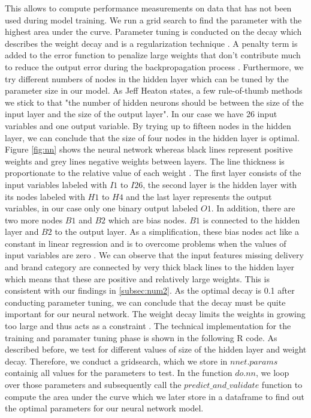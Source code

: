 \documentclass[12pt]{article}
\begin{document}
This allows to compute performance measurements on data that has not been used during model training. We run a grid search to find the parameter with the highest area under the curve.
Parameter tuning is conducted on the decay which describes the weight decay and is a regularization technique \cite{nielsen2015neural}. A penalty term is added to the error function to penalize large weights that don’t contribute much to reduce the output error during the backpropagation process \cite{witten2016data}. Furthermore, we try different numbers of nodes in the hidden layer which can be tuned by the parameter size in our model. As Jeff Heaton states, a few rule-of-thumb methods we stick to that "the number of hidden neurons should be between the size of the input layer and the size of the output layer". In our case we have 26 input variables and one output variable. By trying up to fifteen nodes in the hidden layer, we can conclude that the size of four nodes in the hidden layer is optimal. Figure \ref{fig:nn} shows the neural network whereas black lines represent positive weights and grey lines negative weights between layers. The line thickness is proportionate to the relative value of each weight \cite{beck2016neural}. The first layer consists of the input variables labeled with $I1$ to $I26$, the second layer is the hidden layer with its nodes labeled with $H1$ to $H4$ and the last layer represents the output variables, in our case only one binary output labeled $O1$. In addition, there are two more nodes $B1$ and $B2$ which are bias nodes. $B1$ is connected to the hidden layer and $B2$ to the output layer. As a simplification, these bias nodes act like a constant in linear regression and is to overcome problems when the values of input variables are zero \cite{tu1996advantages}. We can observe that the input features missing delivery and brand category are connected by very thick black lines to the hidden layer which means that these are positive and relatively large weights. This is consistent with our findings in \ref{subsec:num2}. As the optimal decay is 0.1 after conducting parameter tuning, we can conclude that the decay must be quite important for our neural network. The weight decay limits the weights in growing too large and thus acts as a constraint \cite{krogh1992simple}. 
The technical implementation for the training and paramater tuning phase is shown in the following R code. As described before, we test for different values of size of the hidden layer and weight decay. Therefore, we conduct a gridsearch, which we store in $nnet.params$ containig all values for the parameters to test. In the function $do.nn$, we loop over those parameters and subsequently call the $predict\_and\_validate$ function to compute the area under the curve which we later store in a dataframe to find out the optimal parameters for our neural network model.
\end{document}
